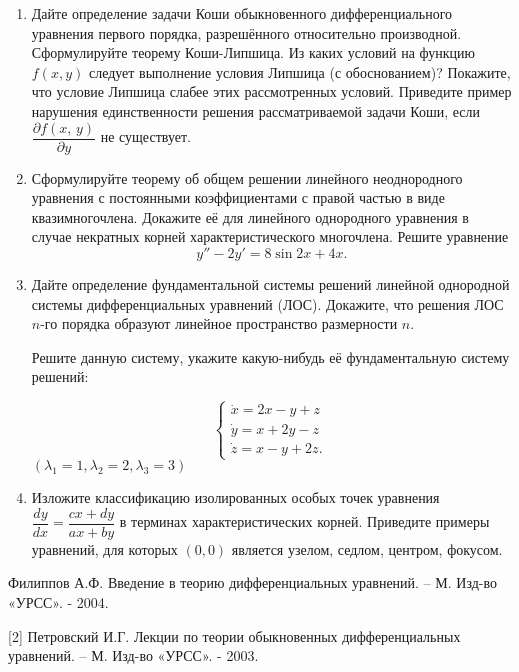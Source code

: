 %
%

\begin{enumerate}
\item Дайте определение задачи Коши обыкновенного дифференциального уравнения первого порядка, разрешённого относительно производной. Сформулируйте теорему Коши-Липшица. Из каких условий на функцию $f(x, y)$ следует выполнение условия Липшица (с обоснованием)?  Покажите, что условие Липшица слабее этих рассмотренных условий. Приведите пример нарушения единственности решения рассматриваемой задачи Коши, если $\dfrac{\partial f(x,\,y)}{\partial y}$ не существует. 

\item Сформулируйте теорему об общем решении линейного неоднородного уравнения с постоянными коэффициентами с правой частью в виде квазимногочлена. Докажите её для линейного однородного уравнения в случае некратных корней характеристического многочлена.
Решите уравнение
 $$y''-2y'=8 \sin 2 x+4x.$$

\item Дайте определение фундаментальной системы решений линейной однородной системы дифференциальных уравнений (ЛОС). Докажите, что решения ЛОС $n$-го порядка образуют линейное пространство размерности $n$. 

Решите данную систему, укажите какую-нибудь её фундаментальную систему решений:


\begin{equation*}
 \begin{cases}
   \dot{x}=2 x-y+z\\
\dot{y}=x+2y-z\\
\dot{z}=x-y+2z.
  \
 \end{cases}  
\end{equation*}
$(\lambda_{1}=1, \lambda_2=2, \lambda_3=3)$

\item Изложите классификацию изолированных особых точек уравнения $\dfrac{dy}{dx}=\dfrac{cx+dy}{ax+by}$ в терминах характеристических корней. Приведите примеры уравнений, для которых $(0, 0)$ является узелом, седлом, центром, фокусом.

\end{enumerate}

\bigskip
[1] Филиппов А.Ф. Введение в теорию дифференциальных уравнений. – М. Изд-во «УРСС». - 2004.

[2] Петровский И.Г. Лекции по теории обыкновенных дифференциальных уравнений. – М. Изд-во «УРСС». - 2003.


